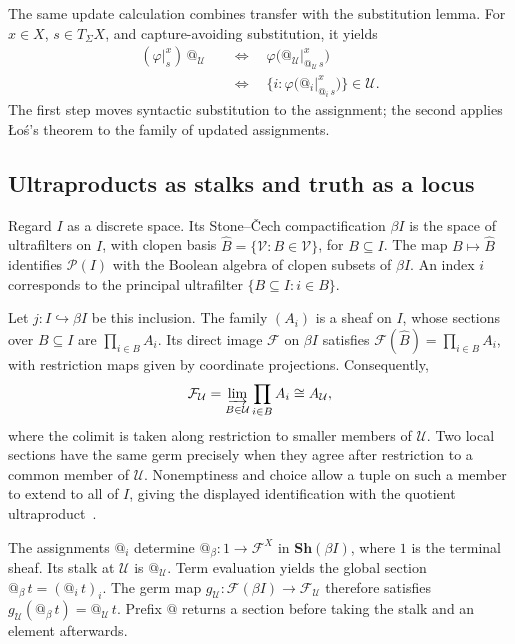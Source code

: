 \documentclass[11pt]{article}
\makeatletter
\newcommand{\atsign}{\mathord{@}}
\theoremstyle{definition}
\makeatother
\begin{document}
The same update calculation combines transfer with the substitution
lemma. For \(x\in X\), \(s\in T_\Sigma X\), and capture-avoiding
substitution, it yields
\[
\begin{aligned}
(\varphi\vert_s^x)\,\atsign_{\mathcal U}
&\quad\Longleftrightarrow\quad
\varphi\bigl(\atsign_{\mathcal U}
                  \vert_{\atsign_{\mathcal U}\,s}^{x}\bigr)\\
&\quad\Longleftrightarrow\quad
\bigl\{i:\varphi\bigl(\atsign_i\vert_{\atsign_i\,s}^{x}\bigr)\bigr\}
\in\mathcal U.
\end{aligned}
\]
The first step moves syntactic substitution to the assignment; the second
applies \L{}o\'s's theorem to the family of updated assignments.

\subsection{Ultraproducts as stalks and truth as a locus}

Regard \(I\) as a discrete space. Its Stone--\v{C}ech compactification
\(\beta I\) is the space of ultrafilters on \(I\), with clopen basis
\(\widehat B=\{\mathcal V:B\in\mathcal V\}\), for \(B\subseteq I\).
The map \(B\mapsto\widehat B\) identifies \(\mathcal P(I)\) with the
Boolean algebra of clopen subsets of \(\beta I\).
An index \(i\) corresponds to the principal ultrafilter
\(\{B\subseteq I:i\in B\}\).

Let \(j:I\hookrightarrow\beta I\) be this inclusion.
The family \((A_i)\) is a sheaf on \(I\), whose sections over
\(B\subseteq I\) are \(\prod_{i\in B}A_i\).
Its direct image \(\mathcal F\) on \(\beta I\) satisfies
\(\mathcal F(\widehat B)=\prod_{i\in B}A_i\), with restriction maps
given by coordinate projections. Consequently,
\[
\mathcal F_{\mathcal U}
=\varinjlim_{B\in\mathcal U}\prod_{i\in B}A_i
\cong A_{\mathcal U},
\]
where the colimit is taken along restriction to smaller members of
\(\mathcal U\). Two local sections have the same germ precisely when
they agree after restriction to a common member of \(\mathcal U\).
Nonemptiness and choice allow a tuple on such a member to extend to
all of \(I\), giving the displayed identification with the quotient
ultraproduct~\cite[Example~14]{LurieUltraproducts}.

The assignments \(\atsign_i\) determine
\(\atsign_\beta:1\to\mathcal F^X\) in
\(\mathbf{Sh}(\beta I)\), where \(1\) is the terminal sheaf.
Its stalk at \(\mathcal U\) is \(\atsign_{\mathcal U}\).
Term evaluation yields the global section
\(\atsign_\beta\,t=(\atsign_i\,t)_i\).
The germ map \(g_{\mathcal U}:\mathcal F(\beta I)\to\mathcal F_{\mathcal U}\)
therefore satisfies
\(g_{\mathcal U}(\atsign_\beta\,t)=\atsign_{\mathcal U}\,t\).
Prefix \(\atsign\) returns a section before taking the stalk and an
element afterwards.
\end{document}

